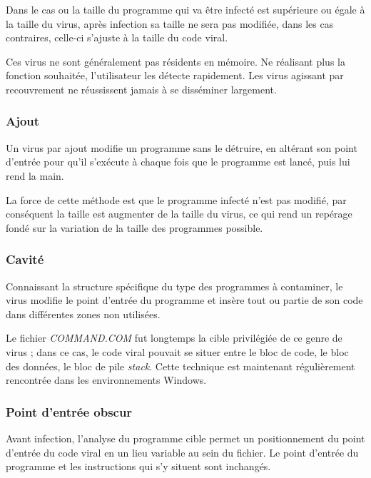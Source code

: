         Dans le cas ou la taille du programme qui va être infecté est supérieure ou égale à la taille du virus, 
        après infection sa taille ne sera pas modifiée, dans les cas contraires, 
        celle-ci s’ajuste à la taille du code viral.

        Ces virus ne sont généralement pas résidents en mémoire. Ne réalisant plus la fonction souhaitée, 
        l’utilisateur les détecte rapidement. Les virus agissant par recouvrement ne réussissent jamais 
        à se disséminer largement.

        \subsubsection{Ajout}
        Un virus par ajout modifie un programme sans le détruire, en altérant son point d’entrée pour 
        qu’il s'exécute à chaque fois que le programme est lancé, puis lui rend la main.

        La force de cette méthode est que le programme infecté n’est pas modifié, par conséquent la taille 
        est augmenter de la taille du virus, ce qui rend un repérage fondé sur la variation de 
        la taille des programmes possible.

        \subsubsection{Cavité}
        Connaissant la structure spécifique du type des programmes à contaminer, le virus modifie le point 
        d'entrée du programme et insère tout ou partie de son code dans différentes zones non utilisées. 
        
        Le fichier \emph{COMMAND.COM} fut longtemps la cible privilégiée de ce genre de virus ; 
        dans ce cas, le code viral pouvait se situer entre le bloc de code, le bloc des données, le bloc de pile 
        \emph{stack}. Cette technique est maintenant régulièrement rencontrée dans les environnements Windows.

        \subsubsection{Point d'entrée obscur}
        Avant infection, l'analyse du programme cible permet un positionnement du point d'entrée du code 
        viral en un lieu variable au sein du fichier. Le point d’entrée du programme et les instructions qui 
        s’y situent sont inchangés.

